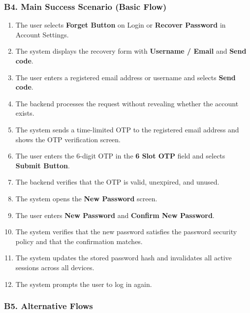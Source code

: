 \documentclass[12pt]{article}
\begin{document}
\hypertarget{sec:b4-main-success-scenario-basic-flow}{}
\subsubsection*{B4. Main Success Scenario (Basic Flow)}
\par\medskip

\begin{enumerate}
\item The user selects \textbf{Forget Button} on Login or \textbf{Recover Password} in Account Settings.
\item The system displays the recovery form with \textbf{Username / Email} and \textbf{Send code}.
\item The user enters a registered email address or username and selects \textbf{Send code}.
\item The backend processes the request without revealing whether the account exists.
\item The system sends a time-limited OTP to the registered email address and shows the OTP verification screen.
\item The user enters the 6-digit OTP in the \textbf{6 Slot OTP} field and selects \textbf{Submit Button}.
\item The backend verifies that the OTP is valid, unexpired, and unused.
\item The system opens the \textbf{New Password} screen.
\item The user enters \textbf{New Password} and \textbf{Confirm New Password}.
\item The system verifies that the new password satisfies the password security policy and that the confirmation matches.
\item The system updates the stored password hash and invalidates all active sessions across all devices.
\item The system prompts the user to log in again.
\end{enumerate}
\par\medskip

\hypertarget{sec:b5-alternative-flows}{}
\subsubsection*{B5. Alternative Flows}
\par\medskip
\end{document}

